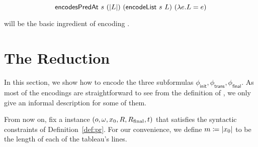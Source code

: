 \begin{proposition}
  \[\textsf{encodesPredAt}~s~(|L|)~(\textsf{encodeList}~s~L)~(\lambda e. L = e) \]
\end{proposition}

\encodeList{} will be the basic ingredient of encoding \PR{}. 

\section{The Reduction}
In this section, we show how to encode the three subformulas $\phi_{\textsf{init}}, \phi_{\textsf{trans}}, \phi_{\textsf{final}}$. 
As most of the encodings are straightforward to see from the definition of \PR{}, we only give an informal description for some of them. 

From now on, fix a \BPR{} instance $(o, \omega, x_0, R, R_{\text{final}}, t)$ that satisfies the syntactic constraints of Definition~\ref{def:pr}.
For our convenience, we define $m \coloneqq |x_0|$ to be the length of each of the tableau's lines. 

